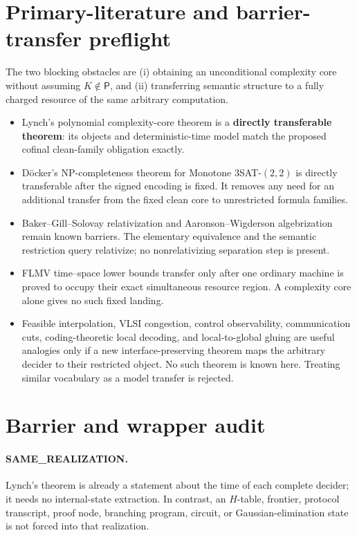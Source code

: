 \documentclass[11pt]{article}
\newcommand{\Pclass}{\mathsf P}
\begin{document}
\section{Primary-literature and barrier-transfer preflight}
The two blocking obstacles are (i) obtaining an unconditional complexity core
without assuming \(K\notin\Pclass\), and (ii) transferring semantic structure
to a fully charged resource of the same arbitrary computation.
\begin{itemize}[leftmargin=*]
\item Lynch's polynomial complexity-core theorem is a
\textbf{directly transferable theorem}: its objects and deterministic-time
model match the proposed cofinal clean-family obligation exactly.
\item D\"ocker's NP-completeness theorem for Monotone \(3\)SAT-\((2,2)\) is
directly transferable after the signed encoding is fixed.  It removes any
need for an additional transfer from the fixed clean core to unrestricted
formula families.
\item Baker--Gill--Solovay relativization and Aaronson--Wigderson
algebrization remain known barriers.  The elementary equivalence and the
semantic restriction query relativize; no nonrelativizing separation step is
present.
\item FLMV time--space lower bounds transfer only after one ordinary machine
is proved to occupy their exact simultaneous resource region.  A complexity
core alone gives no such fixed landing.
\item Feasible interpolation, VLSI congestion, control observability,
communication cuts, coding-theoretic local decoding, and local-to-global
gluing are useful analogies only if a new interface-preserving theorem maps
the arbitrary decider to their restricted object.  No such theorem is known
here.  Treating similar vocabulary as a model transfer is rejected.
\end{itemize}

\section{Barrier and wrapper audit}
\paragraph{SAME\_REALIZATION.}
Lynch's theorem is already a statement about the time of each complete
decider; it needs no internal-state extraction.  In contrast, an \(H\)-table,
frontier, protocol transcript, proof node, branching program, circuit, or
Gaussian-elimination state is not forced into that realization.
\end{document}
